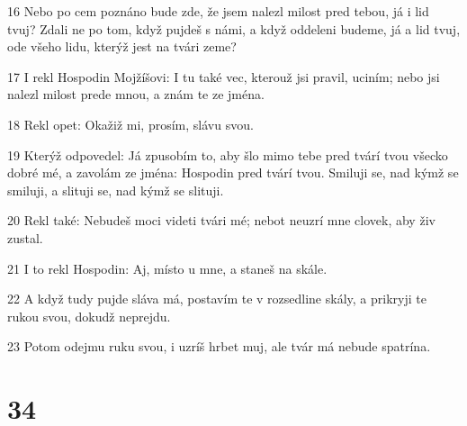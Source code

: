 \par 16 Nebo po cem poznáno bude zde, že jsem nalezl milost pred tebou, já i lid tvuj? Zdali ne po tom, když pujdeš s námi, a když oddeleni budeme, já a lid tvuj, ode všeho lidu, kterýž jest na tvári zeme?
\par 17 I rekl Hospodin Mojžíšovi: I tu také vec, kterouž jsi pravil, uciním; nebo jsi nalezl milost prede mnou, a znám te ze jména.
\par 18 Rekl opet: Okažiž mi, prosím, slávu svou.
\par 19 Kterýž odpovedel: Já zpusobím to, aby šlo mimo tebe pred tvárí tvou všecko dobré mé, a zavolám ze jména: Hospodin pred tvárí tvou. Smiluji se, nad kýmž se smiluji, a slituji se, nad kýmž se slituji.
\par 20 Rekl také: Nebudeš moci videti tvári mé; nebot neuzrí mne clovek, aby živ zustal.
\par 21 I to rekl Hospodin: Aj, místo u mne, a staneš na skále.
\par 22 A když tudy pujde sláva má, postavím te v rozsedline skály, a prikryji te rukou svou, dokudž neprejdu.
\par 23 Potom odejmu ruku svou, i uzríš hrbet muj, ale tvár má nebude spatrína.

\chapter{34}

